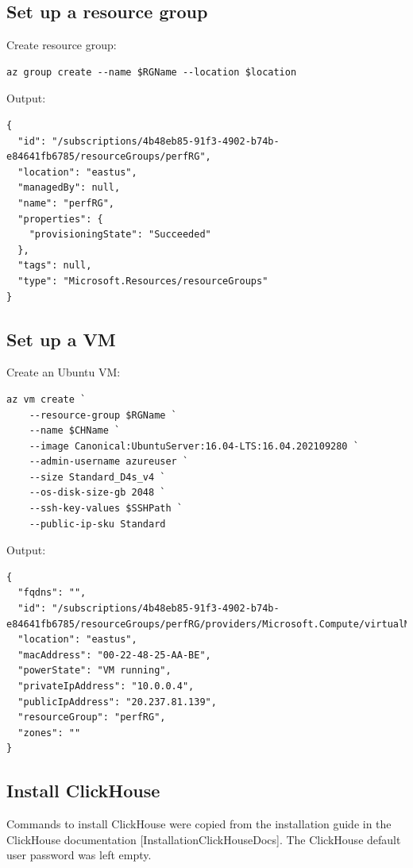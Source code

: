 \subsection{Set up a resource group}
\label{sec:orgccc1bce}
Create resource group:
\begin{verbatim}
az group create --name $RGName --location $location
\end{verbatim}

Output:
\begin{verbatim}
{
  "id": "/subscriptions/4b48eb85-91f3-4902-b74b-e84641fb6785/resourceGroups/perfRG",
  "location": "eastus",
  "managedBy": null,
  "name": "perfRG",
  "properties": {
    "provisioningState": "Succeeded"
  },
  "tags": null,
  "type": "Microsoft.Resources/resourceGroups"
}
\end{verbatim}
\subsection{Set up a VM}
\label{sec:orgc560500}
Create an Ubuntu VM:
\begin{verbatim}
az vm create `
    --resource-group $RGName `
    --name $CHName `
    --image Canonical:UbuntuServer:16.04-LTS:16.04.202109280 `
    --admin-username azureuser `
    --size Standard_D4s_v4 `
    --os-disk-size-gb 2048 `
    --ssh-key-values $SSHPath `
    --public-ip-sku Standard
\end{verbatim}

Output:
\begin{verbatim}
{
  "fqdns": "",
  "id": "/subscriptions/4b48eb85-91f3-4902-b74b-e84641fb6785/resourceGroups/perfRG/providers/Microsoft.Compute/virtualMachines/perfClickhouseVM",
  "location": "eastus",
  "macAddress": "00-22-48-25-AA-BE",
  "powerState": "VM running",
  "privateIpAddress": "10.0.0.4",
  "publicIpAddress": "20.237.81.139",
  "resourceGroup": "perfRG",
  "zones": ""
}
\end{verbatim}
\subsection{Install ClickHouse}
\label{sec:org963a40c}
Commands to install ClickHouse were copied from the installation guide in the ClickHouse documentation [InstallationClickHouseDocs].
The ClickHouse default user password was left empty.


